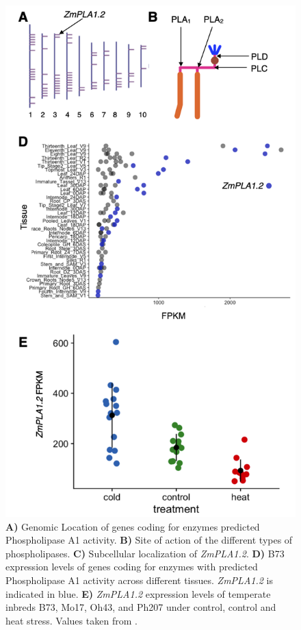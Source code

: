 \documentclass[9pt,twocolumn,twoside,lineno]{BioRxiv}
\begin{document}
\begin{figure}[t]
\begin{center}
\includegraphics[width=0.4\paperwidth]{Sup_Figures/Sup_Fig_3.png}
\caption{\textbf{A)} Genomic Location of genes coding for enzymes predicted Phospholipase A1 activity. 
\textbf{B)} Site of action of the different types of phospholipases.
\textbf{C)} Subcellular localization of \textit{ZmPLA1.2}.
\textbf{D)} B73 expression levels of genes coding for enzymes with predicted Phospholipase A1 activity across different tissues. \textit{ZmPLA1.2} is indicated in blue. 
\textbf{E)} \textit{ZmPLA1.2} expression levels of temperate inbreds B73, Mo17, Oh43, and Ph207 under control, control and heat stress. Values taken from \cite{Waters2017-nat}. 
} 
\label{SupFig3}
\end{center}
\end{figure}  
\end{document}
